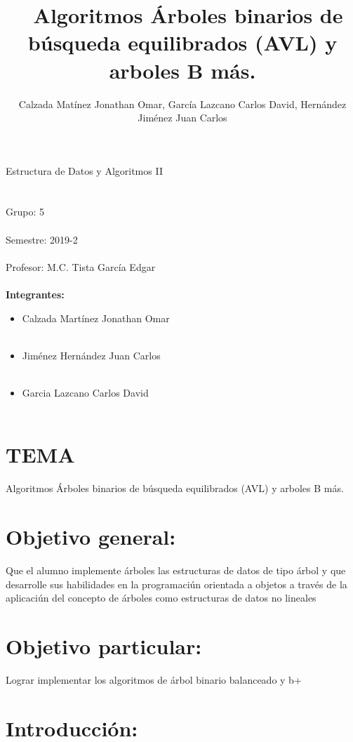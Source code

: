 \documentclass[11pt,a4paper]{report}
\author{Calzada Mat\'inez Jonathan Omar, Garc\'ia Lazcano Carlos David, Hern\'andez Jim\'enez Juan Carlos}
\begin{document}
\title{\ Algoritmos   \'Arboles binarios de b\'usqueda equilibrados (AVL) y arboles B m\'as.}

	\huge Estructura de Datos y Algoritmos II
	\\
	\\
	\\
	\large Grupo: 5
	\\
	\\
	Semestre: 2019-2
	\\
	\\
	Profesor: M.C. Tista García Edgar
	\\
	\\
	\textbf{Integrantes:}

	\begin{itemize}
		\item Calzada Mart\'inez Jonathan Omar
		\\
		\\
		\item Jim\'enez Hern\'andez Juan Carlos
		\\
		\\
		\item Garcia Lazcano Carlos David
		\\
		\\
	\end{itemize}
\section{TEMA}

 Algoritmos   \'Arboles binarios de b\'usqueda equilibrados (AVL) y arboles B m\'as.
 \section{Objetivo general:}
 
  Que el alumno implemente \'arboles las estructuras de datos de tipo \'arbol y que desarrolle sus
habilidades  en la programaci\'un orientada a objetos a trav\'es de la aplicaci\'un del concepto de \'arboles como
estructuras de datos no lineales
 \section{Objetivo particular:}
  Lograr implementar los algoritmos de \'arbol binario balanceado y b+

\section{Introducci\'on:}
\end{document}
